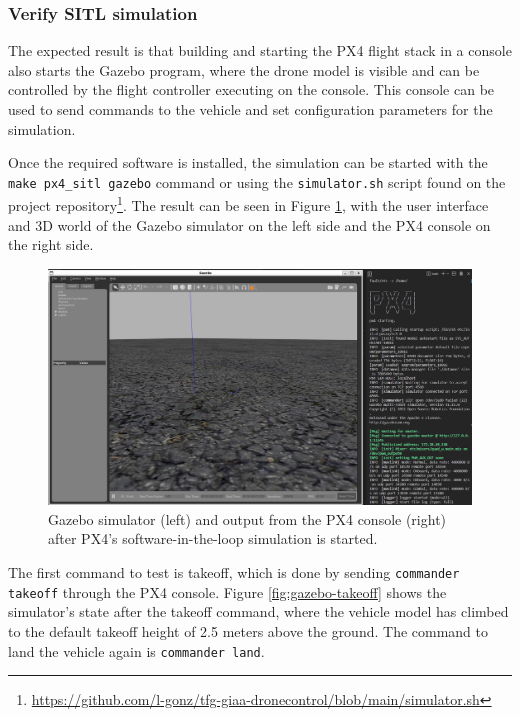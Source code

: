 
\subsubsection{Verify SITL simulation}

The expected result is that building and starting the PX4 flight stack in a console also starts the Gazebo program, where the drone model is visible and can be controlled by the flight controller executing on the console. This console can be used to send commands to the vehicle and set configuration parameters for the simulation.

Once the required software is installed, the simulation can be started with the \texttt{make\ px4\_sitl\ gazebo} command or using the \texttt{simulator.sh} script found on the project repository\footnote{\url{https://github.com/l-gonz/tfg-giaa-dronecontrol/blob/main/simulator.sh}}.
The result can be seen in Figure \ref{fig:gazebo}, with the user interface and 3D world of the Gazebo simulator on the left side and the PX4 console on the right side.


\begin{figure}
  \centering
  \includegraphics[width=\textwidth, keepaspectratio]{img/gazebo.png}
  \caption{Gazebo simulator (left) and output from the PX4 console (right) after PX4's software-in-the-loop simulation is started.}
  \label{fig:gazebo}
\end{figure}

The first command to test is takeoff, which is done by sending \texttt{commander takeoff} through the PX4 console.
Figure \ref{fig:gazebo-takeoff} shows the simulator's state after the takeoff command, where the vehicle model has climbed to the default takeoff height of 2.5 meters above the ground.
The command to land the vehicle again is \texttt{commander land}.

